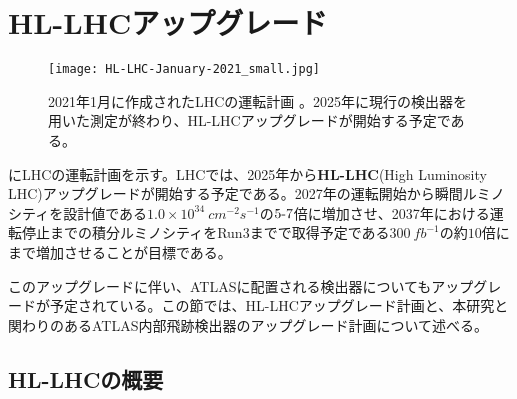 \section{HL-LHCアップグレード}
\label{sec:HL-LHC}
\begin{figure}[tbp]
  \centering
  \texttt{[image: HL-LHC-January-2021\_small.jpg]}
  \caption[LHCの運転計画]{2021年1月に作成されたLHCの運転計画 \cite{hl-lhc}。2025年に現行の検出器を用いた測定が終わり、HL-LHCアップグレードが開始する予定である。}
  \label{fig:hl-lhc}
\end{figure}

にLHCの運転計画を示す。LHCでは、2025年から\textbf{HL-LHC}(High Luminosity LHC)アップグレードが開始する予定である。2027年の運転開始から瞬間ルミノシティを設計値である$1.0\times 10^{34}\ \si{cm^{-2}s^{-1}}$の$5 \mathchar`- 7$倍に増加させ、2037年における運転停止までの積分ルミノシティをRun3までで取得予定である$300\ \si{fb^{-1}}$の約$10$倍にまで増加させることが目標である。

このアップグレードに伴い、ATLASに配置される検出器についてもアップグレードが予定されている。この節では、HL-LHCアップグレード計画と、本研究と関わりのあるATLAS内部飛跡検出器のアップグレード計画について述べる。

\subsection{HL-LHCの概要}
\label{sec:HL-LHC-gaiyou}

